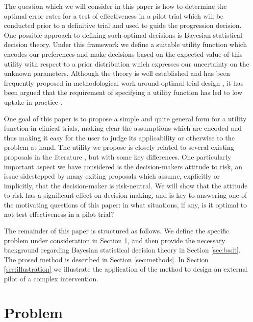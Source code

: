 \documentclass[sagev, Crown]{sagej}
\begin{document}
The question which we will consider in this paper is how to determine the optimal error rates for a test of effectiveness in a pilot trial which will be conducted prior to a definitive trial and used to guide the progression decision. One possible approach to defining such optimal decisions is Bayesian statistical decision theory. Under this framework we define a suitable utility function which encodes our preferences and make decisions based on the expected value of this utility with respect to a prior distribution which expresses our uncertainty on 
the unknown parameters. Although the theory is well established \cite{Raiffa1961, Keeney1976} and has been frequently proposed in methodological work around optimal trial design \cite{Lindley1997, Hee2016}, it has been argued that the requirement of specifying a utility function has led to low uptake in practice \cite{Joseph1997a}. 

One goal of this paper is to propose a simple and quite general form for a utility function in clinical trials, making clear the assumptions which are encoded and thus making it easy for the user to judge its applicability or otherwise to the problem at hand. The utility we propose is closely related to several existing proposals in the literature \cite{Pearce2018 ...}, but with some key differences. One particularly important aspect we have considered is the decision-makers attitude to risk, an issue sidestepped by many exiting proposals which assume, explicitly or implicitly, that the decision-maker is risk-neutral. We will show that the attitude to risk has a significant effect on decision making, and is key to answering one of the motivating questions of this paper: in what situations, if any, is it optimal to not test effectiveness in a pilot trial?

The remainder of this paper is structured as follows. We define the specific problem under consideration in Section \ref{sec:problem}, and then provide the necessary background regarding Bayesian statistical decision theory in Section \ref{sec:bsdt}. The prosed method is described in Section \ref{sec:methods}. In Section \ref{sec:illustration} we illustrate the application of the method to design an external pilot of a complex intervention.


\section{Problem}\label{sec:problem}
\end{document}
